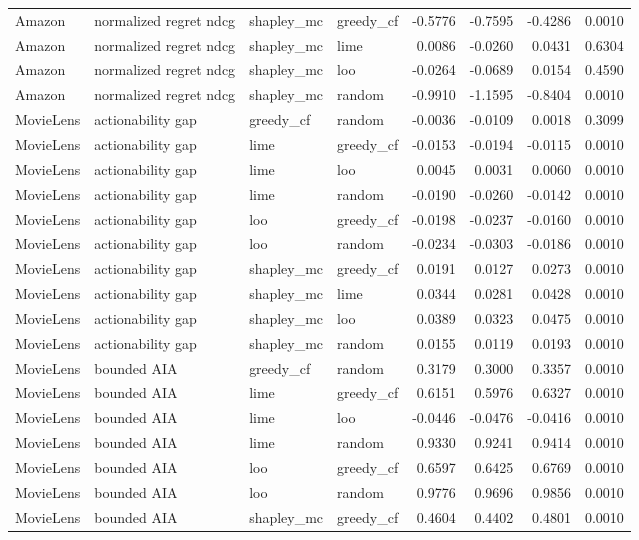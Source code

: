 \begin{longtable}{@{}p{}p{}p{}p{}rrrr@{}}
Amazon & normalized regret ndcg & shapley\_mc & greedy\_cf & -0.5776 & -0.7595 & -0.4286 & 0.0010 \\
Amazon & normalized regret ndcg & shapley\_mc & lime & 0.0086 & -0.0260 & 0.0431 & 0.6304 \\
Amazon & normalized regret ndcg & shapley\_mc & loo & -0.0264 & -0.0689 & 0.0154 & 0.4590 \\
Amazon & normalized regret ndcg & shapley\_mc & random & -0.9910 & -1.1595 & -0.8404 & 0.0010 \\
MovieLens & actionability gap & greedy\_cf & random & -0.0036 & -0.0109 & 0.0018 & 0.3099 \\
MovieLens & actionability gap & lime & greedy\_cf & -0.0153 & -0.0194 & -0.0115 & 0.0010 \\
MovieLens & actionability gap & lime & loo & 0.0045 & 0.0031 & 0.0060 & 0.0010 \\
MovieLens & actionability gap & lime & random & -0.0190 & -0.0260 & -0.0142 & 0.0010 \\
MovieLens & actionability gap & loo & greedy\_cf & -0.0198 & -0.0237 & -0.0160 & 0.0010 \\
MovieLens & actionability gap & loo & random & -0.0234 & -0.0303 & -0.0186 & 0.0010 \\
MovieLens & actionability gap & shapley\_mc & greedy\_cf & 0.0191 & 0.0127 & 0.0273 & 0.0010 \\
MovieLens & actionability gap & shapley\_mc & lime & 0.0344 & 0.0281 & 0.0428 & 0.0010 \\
MovieLens & actionability gap & shapley\_mc & loo & 0.0389 & 0.0323 & 0.0475 & 0.0010 \\
MovieLens & actionability gap & shapley\_mc & random & 0.0155 & 0.0119 & 0.0193 & 0.0010 \\
MovieLens & bounded AIA & greedy\_cf & random & 0.3179 & 0.3000 & 0.3357 & 0.0010 \\
MovieLens & bounded AIA & lime & greedy\_cf & 0.6151 & 0.5976 & 0.6327 & 0.0010 \\
MovieLens & bounded AIA & lime & loo & -0.0446 & -0.0476 & -0.0416 & 0.0010 \\
MovieLens & bounded AIA & lime & random & 0.9330 & 0.9241 & 0.9414 & 0.0010 \\
MovieLens & bounded AIA & loo & greedy\_cf & 0.6597 & 0.6425 & 0.6769 & 0.0010 \\
MovieLens & bounded AIA & loo & random & 0.9776 & 0.9696 & 0.9856 & 0.0010 \\
MovieLens & bounded AIA & shapley\_mc & greedy\_cf & 0.4604 & 0.4402 & 0.4801 & 0.0010 \\

\end{longtable}
